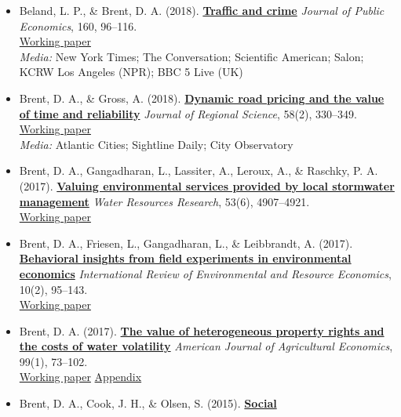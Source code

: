 \documentclass[
  11pt,
]{article}
\begin{document}
\begin{itemize}
\item
  Beland, L. P., \& Brent, D. A. (2018).
  \textbf{\href{https://www.sciencedirect.com/science/article/pii/S0047272718300422}{Traffic
  and crime}} \emph{Journal of Public Economics}, 160, 96--116.\\
  \href{assets/papers/beland_brent_traffic_crime_wp.pdf}{Working
  paper}\\
  \emph{Media:} New York Times; The Conversation; Scientific American;
  Salon; KCRW Los Angeles (NPR); BBC 5 Live (UK)
\item
  Brent, D. A., \& Gross, A. (2018).
  \textbf{\href{https://onlinelibrary.wiley.com/doi/10.1111/jors.12354}{Dynamic
  road pricing and the value of time and reliability}} \emph{Journal of
  Regional Science}, 58(2), 330--349.\\
  \href{assets/papers/brent_gross_dynamic_pricing_wp.pdf}{Working
  paper}\\
  \emph{Media:} Atlantic Cities; Sightline Daily; City Observatory
\item
  Brent, D. A., Gangadharan, L., Lassiter, A., Leroux, A., \& Raschky,
  P. A. (2017).
  \textbf{\href{https://agupubs.onlinelibrary.wiley.com/doi/10.1002/2016WR020356}{Valuing
  environmental services provided by local stormwater management}}
  \emph{Water Resources Research}, 53(6), 4907--4921.\\
  \href{assets/papers/brent_et_al_stormwater_services_wp.pdf}{Working
  paper}
\item
  Brent, D. A., Friesen, L., Gangadharan, L., \& Leibbrandt, A. (2017).
  \textbf{\href{https://www.nowpublishers.com/article/Details/IRERE-013}{Behavioral
  insights from field experiments in environmental economics}}
  \emph{International Review of Environmental and Resource Economics},
  10(2), 95--143.\\
  \href{assets/papers/brent_et_al_behavioral_insights_wp.pdf}{Working
  paper}
\item
  Brent, D. A. (2017).
  \textbf{\href{https://academic.oup.com/ajae/article/99/1/73/2633452}{The
  value of heterogeneous property rights and the costs of water
  volatility}} \emph{American Journal of Agricultural Economics}, 99(1),
  73--102.\\
  \href{assets/papers/brent_water_volatility_wp.pdf}{Working paper}
  \href{assets/papers/brent_water_volatility_wp_appendix.pdf}{Appendix}
\item
  Brent, D. A., Cook, J. H., \& Olsen, S. (2015).
  \textbf{\href{https://www.journals.uchicago.edu/doi/10.1086/684526}{Social
}}
\end{itemize}
\end{document}

